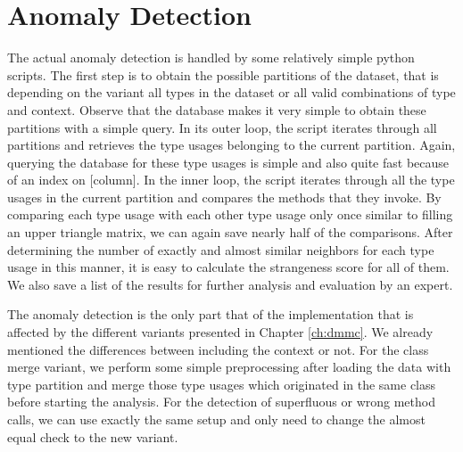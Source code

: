 \section{Anomaly Detection}\label{sec:anomaly}



The actual anomaly detection is handled by some relatively simple python scripts.
The first step is to obtain the possible partitions of the dataset, that is depending on the variant all types in the dataset or all valid combinations of type and context.
Observe that the database makes it very simple to obtain these partitions with a simple query.
In its outer loop, the script iterates through all partitions and retrieves the type usages belonging to the current partition.
Again, querying the database for these type usages is simple and also quite fast because of an index on [column].
In the inner loop, the script iterates through all the type usages in the current partition and compares the methods that they invoke.
By comparing each type usage with each other type usage only once similar to filling an upper triangle matrix, we can again save nearly half of the comparisons.
After determining the number of exactly and almost similar neighbors for each type usage in this manner, it is easy to calculate the strangeness score for all of them.
We also save a list of the results for further analysis and evaluation by an expert.

The anomaly detection is the only part that of the implementation that is affected by the different variants presented in Chapter \ref{ch:dmmc}.
We already mentioned the differences between including the context or not.
For the class merge variant, we perform some simple preprocessing after loading the data with type partition and merge those type usages which originated in the same class before starting the analysis.
For the detection of superfluous or wrong method calls, we can use exactly the same setup and only need to change the almost equal check to the new variant.

